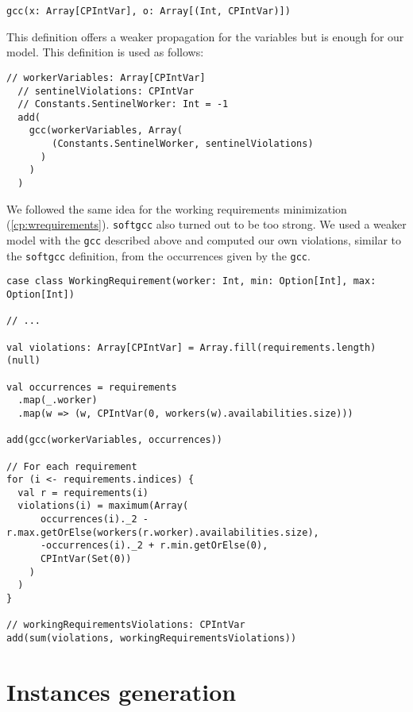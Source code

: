 \documentclass[../thesis.tex]{subfiles}
\begin{document}
\begin{lstlisting}[style=scalaStyle,label={gcc_oscar},caption={Variant of \texttt{gcc} implemented in OscaR},captionpos=b]
gcc(x: Array[CPIntVar], o: Array[(Int, CPIntVar)])
\end{lstlisting}

This definition offers a weaker propagation for the variables but is enough for our model. 
This definition is used as follows:


\begin{lstlisting}[style=scalaStyle,label={gcc_oscar_2},caption={Usage of \texttt{gcc} to count fictitious workers},captionpos=b]
  // workerVariables: Array[CPIntVar]
  // sentinelViolations: CPIntVar
  // Constants.SentinelWorker: Int = -1
  add(
    gcc(workerVariables, Array(
        (Constants.SentinelWorker, sentinelViolations)
      )
    )
  )
\end{lstlisting}

We followed the same idea for the working requirements minimization (\ref{cp:wrequirements}). \texttt{softgcc} also turned out to be too strong.
We used a weaker model with the \texttt{gcc} described above and computed our own violations, similar to the \texttt{softgcc} definition,
from the occurrences given by the \texttt{gcc}.


\begin{lstlisting}[style=scalaStyle,label={gcc_oscar_2},caption={Usage of \texttt{gcc} to count working requirements violations},captionpos=b]
case class WorkingRequirement(worker: Int, min: Option[Int], max: Option[Int])

// ...

val violations: Array[CPIntVar] = Array.fill(requirements.length)(null)

val occurrences = requirements
  .map(_.worker)
  .map(w => (w, CPIntVar(0, workers(w).availabilities.size)))

add(gcc(workerVariables, occurrences))

// For each requirement 
for (i <- requirements.indices) {
  val r = requirements(i)
  violations(i) = maximum(Array(
      occurrences(i)._2 - r.max.getOrElse(workers(r.worker).availabilities.size),
      -occurrences(i)._2 + r.min.getOrElse(0),
      CPIntVar(Set(0))
    )
  )
}

// workingRequirementsViolations: CPIntVar
add(sum(violations, workingRequirementsViolations))
\end{lstlisting}


\section{Instances generation}
\label{section:instance-gen}
\end{document}
